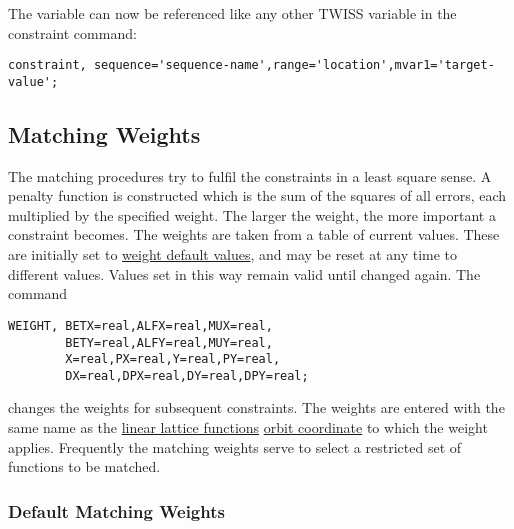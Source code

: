 The variable can now be referenced like any other TWISS variable
in the constraint command:
\begin{verbatim}
constraint, sequence='sequence-name',range='location',mvar1='target-value';
\end{verbatim}

\subsection{Matching Weights}
\label{subsec:match_con_weight}

The matching procedures try to fulfil the constraints
in a least square sense.
A penalty function is constructed which is the sum of the
squares of all errors,
each multiplied by the specified weight.
The larger the weight, the more important a constraint becomes.
The weights are taken from a table of current values.
These are initially set to \hyperlink{default}{weight default values},
and may be reset at any time to different values.
Values set in this way remain valid until changed again.
The command

\begin{verbatim}
WEIGHT, BETX=real,ALFX=real,MUX=real, 
        BETY=real,ALFY=real,MUY=real, 
        X=real,PX=real,Y=real,PY=real, 
        DX=real,DPX=real,DY=real,DPY=real;
\end{verbatim}

changes the weights for subsequent constraints.
The weights are entered with the same name as the
\href{../Introduction/tables.html#linear}{linear lattice functions}
\href{../Introduction/closed_orbit.html}{orbit coordinate} 
to which the weight applies.
Frequently the matching weights serve to select a restricted
set of functions to be matched.

\subsubsection{Default Matching Weights}


